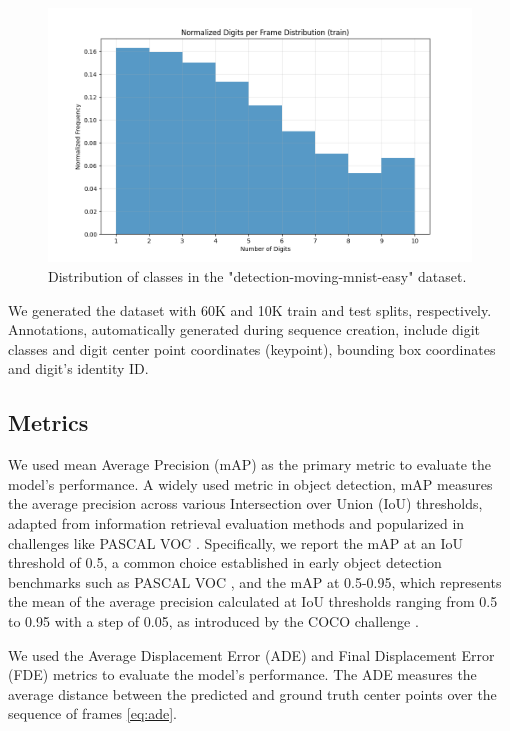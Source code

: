 \begin{figure}
    \centering
    \includegraphics[width=\textwidth]{figures/figure_method_dataset_train_digits_per_frame.png}
    \caption{Distribution of classes in the "detection-moving-mnist-easy" dataset.}
    \label{fig:figure_method_dataset_train_digits_per_frame}
\end{figure}

We generated the dataset with 60K and 10K train and test splits, respectively. Annotations, automatically generated during sequence creation, include digit classes and digit center point coordinates (keypoint), bounding box coordinates and digit's identity ID.

\subsection{Metrics} \label{Methods:Metrics}

We used mean Average Precision (mAP) as the primary metric to evaluate the model's performance. A widely used metric in object detection, mAP measures the average precision across various Intersection over Union (IoU) thresholds, adapted from information retrieval evaluation methods and popularized in challenges like PASCAL VOC \cite{everinghamPascalVisualObject2010}. Specifically, we report the mAP at an IoU threshold of 0.5, a common choice established in early object detection benchmarks such as PASCAL VOC \cite{everinghamPascalVisualObject2010}, and the mAP at 0.5-0.95, which represents the mean of the average precision calculated at IoU thresholds ranging from 0.5 to 0.95 with a step of 0.05, as introduced by the COCO challenge \cite{linMicrosoftCOCOCommon2015a}.

We used the Average Displacement Error (ADE) and Final Displacement Error (FDE) metrics to evaluate the model's performance. The ADE measures the average distance between the predicted and ground truth center points over the sequence of frames \ref{eq:ade}.

